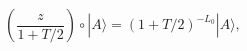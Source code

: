 \begin{equation} %
  \left(\frac{z}{1+T/2}\right)
  \circ |A\rangle  = (1+T/2)^{-L_0} |A\rangle,
\end{equation} 
